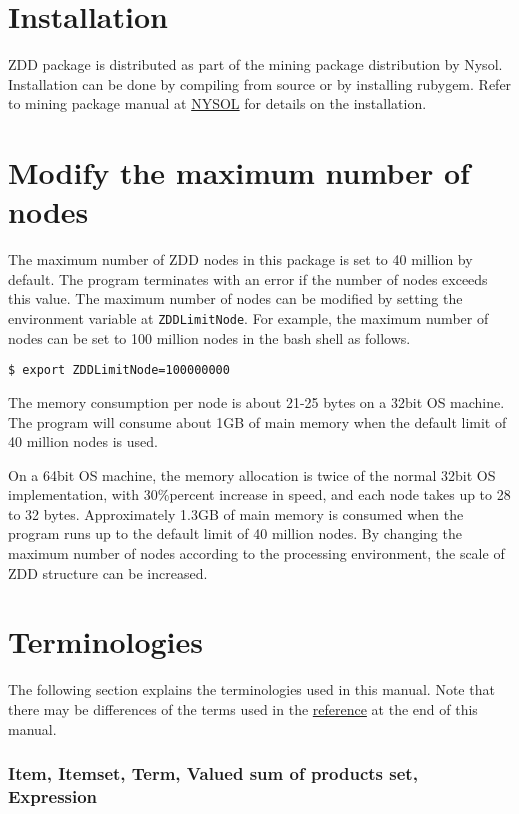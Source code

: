 \section{Installation\label{sect:install}}
ZDD package is distributed as part of the mining package distribution by Nysol. Installation can be done by compiling from source or by installing rubygem.  Refer to mining package manual at \href{http://www.nysol.jp}{NYSOL} for details on the installation.

\section{Modify the maximum number of nodes}
The maximum number of ZDD nodes in this package is set to 40 million by default.
The program terminates with an error if the number of nodes exceeds this value.
The maximum number of nodes can be modified by setting the environment variable at \verb|ZDDLimitNode|.
For example, the maximum number of nodes can be set to 100 million nodes in the  bash shell as follows.
\begin{Verbatim}[baselinestretch=0.7,frame=single]
$ export ZDDLimitNode=100000000
\end{Verbatim}

The memory consumption per node is about 21-25 bytes on a 32bit OS machine. The program will consume about 1GB of main memory when the default limit of 40 million nodes is used. 

On a 64bit OS machine, the memory allocation is twice of the normal 32bit OS implementation, with 30\%percent increase in speed, and each node takes up to 28 to 32 bytes. Approximately 1.3GB of main memory is consumed when the program runs up to the default limit of 40 million nodes. By changing the maximum number of nodes according to the processing environment, the scale of ZDD structure can be increased.

\section{Terminologies\label{sect:terminology}}
The following section explains the terminologies used in this manual.
Note that there may be differences of the terms used in the \hyperref[sect:bib]{reference} at the end of this manual.

\subsubsection*{Item, Itemset, Term, Valued sum of products set, Expression}

